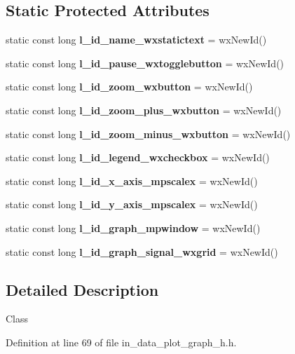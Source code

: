 \subsection*{Static Protected Attributes}
\begin{DoxyCompactItemize}
\item 
static const long \textbf{ l\+\_\+id\+\_\+name\+\_\+wxstatictext} = wx\+New\+Id()
\item 
\mbox{\label{classdata__plot_a038ad084f5f4347db06e04f4577971a8}} 
static const long {\bfseries l\+\_\+id\+\_\+pause\+\_\+wxtogglebutton} = wx\+New\+Id()
\item 
\mbox{\label{classdata__plot_aec0e75ed41fee6b0de0cca8a16057691}} 
static const long {\bfseries l\+\_\+id\+\_\+zoom\+\_\+wxbutton} = wx\+New\+Id()
\item 
\mbox{\label{classdata__plot_a7aff436d8d83364e4e815d2f7bfff7c3}} 
static const long {\bfseries l\+\_\+id\+\_\+zoom\+\_\+plus\+\_\+wxbutton} = wx\+New\+Id()
\item 
\mbox{\label{classdata__plot_aeb24b1c633ae2843b9246be574651c01}} 
static const long {\bfseries l\+\_\+id\+\_\+zoom\+\_\+minus\+\_\+wxbutton} = wx\+New\+Id()
\item 
\mbox{\label{classdata__plot_a10abc0ea5fa305013d1830bf196d38cb}} 
static const long {\bfseries l\+\_\+id\+\_\+legend\+\_\+wxcheckbox} = wx\+New\+Id()
\item 
\mbox{\label{classdata__plot_a64116a5bb4acf43245cede80ba9aeda7}} 
static const long {\bfseries l\+\_\+id\+\_\+x\+\_\+axis\+\_\+mpscalex} = wx\+New\+Id()
\item 
\mbox{\label{classdata__plot_a9287f0398cabdf44fed0917d5b29755a}} 
static const long {\bfseries l\+\_\+id\+\_\+y\+\_\+axis\+\_\+mpscalex} = wx\+New\+Id()
\item 
\mbox{\label{classdata__plot_a42fc81a312aa4155d3b292bbbf67b6e9}} 
static const long {\bfseries l\+\_\+id\+\_\+graph\+\_\+mpwindow} = wx\+New\+Id()
\item 
\mbox{\label{classdata__plot_ac3357130ffef1c84e586d278db565272}} 
static const long {\bfseries l\+\_\+id\+\_\+graph\+\_\+signal\+\_\+wxgrid} = wx\+New\+Id()
\end{DoxyCompactItemize}


\subsection{Detailed Description}
Class 

Definition at line 69 of file in\+\_\+data\+\_\+plot\+\_\+graph\+\_\+h.\+h.



